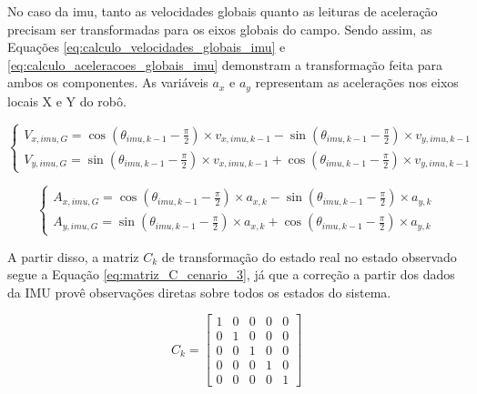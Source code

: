\documentclass[acronym, symbols, table]{fei}
\begin{document}
			No caso da \acrshort{imu}, tanto as velocidades globais quanto as leituras de aceleração precisam ser transformadas para os eixos globais do campo. Sendo assim, as Equações \eqref{eq:calculo_velocidades_globais_imu} e \eqref{eq:calculo_aceleracoes_globais_imu} demonstram a transformação feita para ambos os componentes. As variáveis $a_{x}$ e $a_{y}$ representam as acelerações nos eixos locais X e Y do robô.
		
			\begin{equation}\label{eq:calculo_velocidades_globais_imu}
				\begin{cases}
					V_{x,imu,G} = \cos(\theta_{imu,k-1} - \frac{\pi}{2}) \times v_{x,imu,k-1} - \sin(\theta_{imu,k-1} - \frac{\pi}{2}) \times v_{y,imu,k-1} \\
					V_{y,imu,G} = \sin(\theta_{imu,k-1} - \frac{\pi}{2}) \times v_{x,imu,k-1} + \cos(\theta_{imu,k-1} - \frac{\pi}{2}) \times v_{y,imu,k-1}
				\end{cases}
			\end{equation}
		
			\begin{equation}\label{eq:calculo_aceleracoes_globais_imu}
				\begin{cases}
					A_{x,imu,G} = \cos(\theta_{imu,k-1} - \frac{\pi}{2}) \times a_{x,k} - \sin(\theta_{imu,k-1} - \frac{\pi}{2}) \times a_{y,k} \\
					A_{y,imu,G} = \sin(\theta_{imu,k-1} - \frac{\pi}{2}) \times a_{x,k} + \cos(\theta_{imu,k-1} - \frac{\pi}{2}) \times a_{y,k}
				\end{cases}
			\end{equation}
		
			A partir disso, a matriz $C_k$ de transformação do estado real no estado observado segue a Equação \eqref{eq:matriz_C_cenario_3}, já que a correção a partir dos dados da IMU provê observações diretas sobre todos os estados do sistema.
			
			\begin{equation}\label{eq:matriz_C_cenario_3}
				C_{k} = \begin{bmatrix}
					1 & 0 & 0 & 0 & 0 \\
					0 & 1 & 0 & 0 & 0 \\
					0 & 0 & 1 & 0 & 0 \\
					0 & 0 & 0 & 1 & 0 \\
					0 & 0 & 0 & 0 & 1
				\end{bmatrix}
			\end{equation}
		
\end{document}
